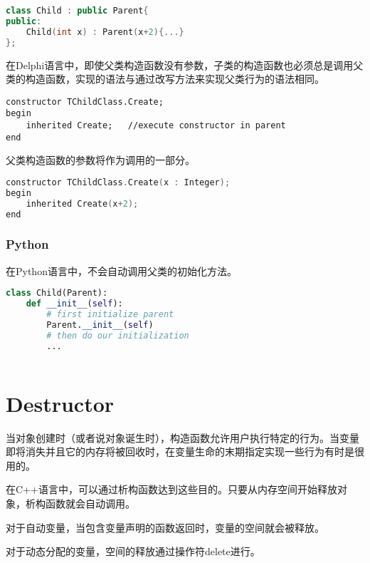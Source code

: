 \begin{lstlisting}[language=C++]
class Child : public Parent{
public:
	Child(int x) : Parent(x+2){...}
};
\end{lstlisting}



在Delphi语言中，即使父类构造函数没有参数，子类的构造函数也必须总是调用父类的构造函数，实现的语法与通过改写方法来实现父类行为的语法相同。


\begin{lstlisting}[language=Delphi]
constructor TChildClass.Create;
begin
	inherited Create;	//execute constructor in parent
end
\end{lstlisting}

父类构造函数的参数将作为调用的一部分。

\begin{lstlisting}[language=C++]
constructor TChildClass.Create(x : Integer);
begin
	inherited Create(x+2);
end
\end{lstlisting}

\subsection{Python}

在Python语言中，不会自动调用父类的初始化方法。


\begin{lstlisting}[language=Python]
class Child(Parent):
	def __init__(self):
		# first initialize parent
		Parent.__init__(self)
		# then do our initialization
		...
\end{lstlisting}


\begin{lstlisting}[language=C++]

\end{lstlisting}



\chapter{Destructor}



当对象创建时（或者说对象诞生时），构造函数允许用户执行特定的行为。当变量即将消失并且它的内存将被回收时，在变量生命的末期指定实现一些行为有时是很用的。

在C++语言中，可以通过析构函数达到这些目的。只要从内存空间开始释放对象，析构函数就会自动调用。

\begin{compactitem}
\item 对于自动变量，当包含变量声明的函数返回时，变量的空间就会被释放。
\item 对于动态分配的变量，空间的释放通过操作符delete进行。
\end{compactitem}


